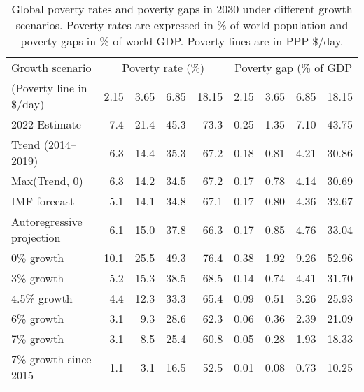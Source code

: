 \begin{table}[h]

\caption{\label{tab:poverty_full}Global poverty rates and poverty gaps in 2030 under different growth scenarios. Poverty rates are expressed in \% of world population and poverty gaps in \% of world GDP. Poverty lines are in PPP \$/day.}
\centering
\begin{tabular}[t]{lrrrrrrrr}
\toprule Growth scenario & \multicolumn{4}{c}{Poverty rate (\%)} & \multicolumn{4}{c}{Poverty gap (\% of GDP} \\ 
 (Poverty line in \$/day)  & 2.15 & 3.65 & 6.85 & 18.15 & 2.15 & 3.65 & 6.85 & 18.15\\
\midrule
2022 Estimate & 7.4 & 21.4 & 45.3 & 73.3 & 0.25 & 1.35 & 7.10 & 43.75\\
Trend (2014--2019) & 6.3 & 14.4 & 35.3 & 67.2 & 0.18 & 0.81 & 4.21 & 30.86\\
Max(Trend, 0) & 6.3 & 14.2 & 34.5 & 67.2 & 0.17 & 0.78 & 4.14 & 30.69\\
IMF forecast & 5.1 & 14.1 & 34.8 & 67.1 & 0.17 & 0.80 & 4.36 & 32.67\\
Autoregressive projection & 6.1 & 15.0 & 37.8 & 66.3 & 0.17 & 0.85 & 4.76 & 33.04\\
0\% growth & 10.1 & 25.5 & 49.3 & 76.4 & 0.38 & 1.92 & 9.26 & 52.96\\
3\% growth & 5.2 & 15.3 & 38.5 & 68.5 & 0.14 & 0.74 & 4.41 & 31.70\\
4.5\% growth & 4.4 & 12.3 & 33.3 & 65.4 & 0.09 & 0.51 & 3.26 & 25.93\\
6\% growth & 3.1 & 9.3 & 28.6 & 62.3 & 0.06 & 0.36 & 2.39 & 21.09\\
7\% growth & 3.1 & 8.5 & 25.4 & 60.8 & 0.05 & 0.28 & 1.93 & 18.33\\
7\% growth since 2015 & 1.1 & 3.1 & 16.5 & 52.5 & 0.01 & 0.08 & 0.73 & 10.25\\
\bottomrule
\end{tabular}
\end{table}